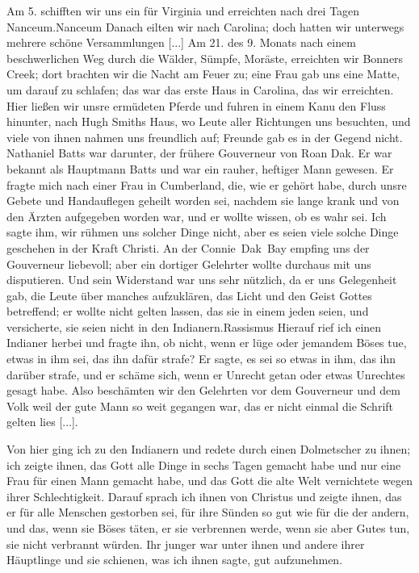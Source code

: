 Am 5. schifften wir uns ein für Virginia und erreichten nach
drei Tagen Nanceum.\indexname{Nanceum} Danach eilten wir 
nach Carolina; doch
hatten wir unterwegs mehrere schöne Versammlungen [...] Am
21. des 9. Monats nach einem beschwerlichen Weg durch die
Wälder, Sümpfe, Moräste, erreichten wir 
Bonners Creek; dort
brachten wir die Nacht am Feuer zu; eine Frau gab uns eine
Matte, um darauf zu schlafen; das war das erste Haus in 
Carolina, das wir erreichten.
Hier ließen wir unsre ermüdeten Pferde und fuhren in einem
Kanu den Fluss hinunter, nach Hugh 
Smiths Haus, wo Leute
aller Richtungen uns besuchten, und viele von ihnen nahmen uns
freundlich auf; Freunde gab es in der Gegend nicht. Nathaniel
Batts war darunter, der frühere Gouverneur von Roan Dak. Er
war bekannt als Hauptmann Batts 
und war ein rauher, heftiger
Mann gewesen. Er fragte mich nach einer Frau in Cumberland,
die, wie er gehört habe, durch unsre Gebete und Handauflegen
geheilt worden sei, nachdem sie lange krank und von den Ärzten
aufgegeben worden war, und er wollte wissen, ob es wahr sei.
Ich sagte ihm, wir rühmen uns solcher Dinge nicht, aber es seien
viele solche Dinge geschehen in der Kraft Christi. An der 
Connie~Dak~Bay empfing uns der Gouverneur 
liebevoll; aber ein dortiger
Gelehrter wollte durchaus mit uns disputieren. Und sein Widerstand 
war uns sehr nützlich, da er uns Gelegenheit gab, die Leute
über manches aufzuklären, das Licht und den Geist Gottes betreffend;
er wollte nicht gelten lassen, das sie in einem jeden seien, und 
versicherte, sie seien nicht in den Indianern.\indexname{Rassismus} 
Hierauf rief ich einen
Indianer herbei und fragte ihn, ob nicht, wenn er lüge oder
jemandem Böses tue, etwas in ihm sei, das ihn dafür strafe? Er
sagte, es sei so etwas in ihm, das ihn darüber strafe, und er
schäme sich, wenn er Unrecht getan oder etwas Unrechtes gesagt
habe. Also beschämten wir den Gelehrten vor dem Gouverneur
und dem Volk weil der gute Mann so weit gegangen war, das er
nicht einmal die Schrift gelten lies [...].

Von hier ging ich zu den Indianern und redete durch einen
Dolmetscher zu ihnen; ich zeigte ihnen, das Gott alle Dinge in
sechs Tagen gemacht habe und nur eine Frau für einen Mann
gemacht habe, und das Gott die alte Welt vernichtete wegen ihrer
Schlechtigkeit. Darauf sprach ich ihnen von Christus und zeigte
ihnen, das er für alle Menschen gestorben sei, für ihre Sünden
so gut wie für die der andern, und das, wenn sie Böses täten, er sie
verbrennen werde, wenn sie aber Gutes tun, sie nicht verbrannt
würden. Ihr junger  war unter ihnen und andere ihrer
Häuptlinge und sie schienen, was ich ihnen sagte, gut aufzunehmen.

